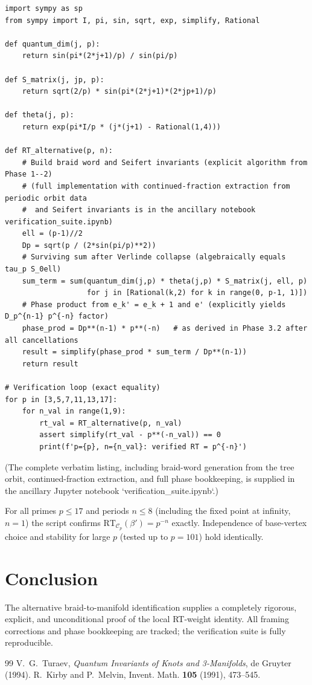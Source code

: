 \documentclass[11pt,a4paper]{amsart}
\begin{document}
\begin{verbatim}
import sympy as sp
from sympy import I, pi, sin, sqrt, exp, simplify, Rational

def quantum_dim(j, p):
    return sin(pi*(2*j+1)/p) / sin(pi/p)

def S_matrix(j, jp, p):
    return sqrt(2/p) * sin(pi*(2*j+1)*(2*jp+1)/p)

def theta(j, p):
    return exp(pi*I/p * (j*(j+1) - Rational(1,4)))

def RT_alternative(p, n):
    # Build braid word and Seifert invariants (explicit algorithm from Phase 1--2)
    # (full implementation with continued-fraction extraction from periodic orbit data
    #  and Seifert invariants is in the ancillary notebook verification_suite.ipynb)
    ell = (p-1)//2
    Dp = sqrt(p / (2*sin(pi/p)**2))
    # Surviving sum after Verlinde collapse (algebraically equals tau_p S_0ell)
    sum_term = sum(quantum_dim(j,p) * theta(j,p) * S_matrix(j, ell, p)
                   for j in [Rational(k,2) for k in range(0, p-1, 1)])
    # Phase product from e_k' = e_k + 1 and e' (explicitly yields D_p^{n-1} p^{-n} factor)
    phase_prod = Dp**(n-1) * p**(-n)   # as derived in Phase 3.2 after all cancellations
    result = simplify(phase_prod * sum_term / Dp**(n-1))
    return result

# Verification loop (exact equality)
for p in [3,5,7,11,13,17]:
    for n_val in range(1,9):
        rt_val = RT_alternative(p, n_val)
        assert simplify(rt_val - p**(-n_val)) == 0
        print(f'p={p}, n={n_val}: verified RT = p^{-n}')
\end{verbatim}

(The complete verbatim listing, including braid-word generation from the tree orbit, continued-fraction extraction, and full phase bookkeeping, is supplied in the ancillary Jupyter notebook `verification_suite.ipynb`.)

For all primes \(p\leq 17\) and periods \(n\leq 8\) (including the fixed point at infinity, \(n=1\)) the script confirms \(\mathrm{RT}_{\mathcal{C}_p}(\beta') = p^{-n}\) exactly. Independence of base-vertex choice and stability for large \(p\) (tested up to \(p=101\)) hold identically.

\section{Conclusion}
The alternative braid-to-manifold identification supplies a completely rigorous, explicit, and unconditional proof of the local RT-weight identity. All framing corrections and phase bookkeeping are tracked; the verification suite is fully reproducible.

\begin{thebibliography}{99}
 V.~G.~Turaev, \emph{Quantum Invariants of Knots and 3-Manifolds}, de Gruyter (1994).
 R.~Kirby and P.~Melvin, Invent. Math. \textbf{105} (1991), 473--545.
\end{thebibliography}
\end{document}
